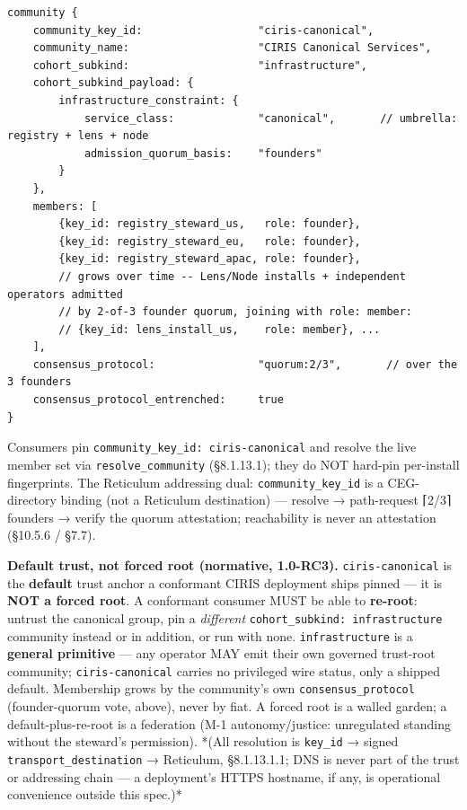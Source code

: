 \documentclass[11pt]{article}
\begin{document}
\begin{lstlisting}
community {
    community_key_id:                  "ciris-canonical",
    community_name:                    "CIRIS Canonical Services",
    cohort_subkind:                    "infrastructure",
    cohort_subkind_payload: {
        infrastructure_constraint: {
            service_class:             "canonical",       // umbrella: registry + lens + node
            admission_quorum_basis:    "founders"
        }
    },
    members: [
        {key_id: registry_steward_us,   role: founder},
        {key_id: registry_steward_eu,   role: founder},
        {key_id: registry_steward_apac, role: founder},
        // grows over time -- Lens/Node installs + independent operators admitted
        // by 2-of-3 founder quorum, joining with role: member:
        // {key_id: lens_install_us,    role: member}, ...
    ],
    consensus_protocol:                "quorum:2/3",       // over the 3 founders
    consensus_protocol_entrenched:     true
}
\end{lstlisting}

Consumers pin \texttt{community\_key\_id: ciris-canonical} and resolve the live member set via \texttt{resolve\_community} (§8.1.13.1); they do NOT hard-pin per-install fingerprints. The Reticulum addressing dual: \texttt{community\_key\_id} is a CEG-directory binding (not a Reticulum destination) — resolve → path-request ⌈2/3⌉ founders → verify the quorum attestation; reachability is never an attestation (§10.5.6 / §7.7).


\textbf{Default trust, not forced root (normative, 1.0-RC3).} \texttt{ciris-canonical} is the \textbf{default} trust anchor a conformant CIRIS deployment ships pinned — it is \textbf{NOT a forced root}. A conformant consumer MUST be able to \textbf{re-root}: untrust the canonical group, pin a \textit{different} \texttt{cohort\_subkind: infrastructure} community instead or in addition, or run with none. \texttt{infrastructure} is a \textbf{general primitive} — any operator MAY emit their own governed trust-root community; \texttt{ciris-canonical} carries no privileged wire status, only a shipped default. Membership grows by the community's own \texttt{consensus\_protocol} (founder-quorum vote, above), never by fiat. A forced root is a walled garden; a default-plus-re-root is a federation (M-1 autonomy/justice: unregulated standing without the steward's permission). *(All resolution is \texttt{key\_id} → signed \texttt{transport\_destination} → Reticulum, §8.1.13.1.1; DNS is never part of the trust or addressing chain — a deployment's HTTPS hostname, if any, is operational convenience outside this spec.)*
\end{document}
